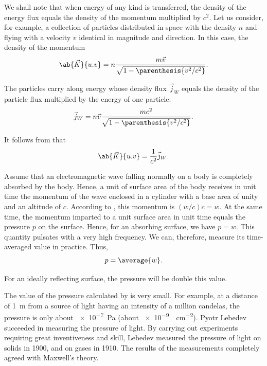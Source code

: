 We shall note that when energy of any kind is transferred, the density of the energy flux equals the density of the momentum multiplied by $c^2$.
Let us consider, for example, a collection of particles distributed in space with the density $n$ and flying with a velocity $v$ identical in magnitude and direction.
In this case, the density of the momentum
\begin{equation}\label{eq:15_38}
    \ab{\vec{K}}{u.v} = n \frac{m\vec{v}}{\sqrt{1 - \parenthesis{v^2/c^2}}}.
\end{equation}

\noindent
The particles carry along energy whose density flux $\vec{j}_W$ equals the density of the particle flux multiplied by the energy of one particle:
\begin{equation}\label{eq:15_39}
    \vec{j}_W = n \vec{v} \frac{mc^2}{\sqrt{1 - \parenthesis{v^2/c^2}}}.
\end{equation}

\noindent
It follows from  that
\begin{equation}\label{eq:15_40}
    \ab{\vec{K}}{u.v} = \frac{1}{c^2} \vec{j}_W.
\end{equation}

Assume that an electromagnetic wave falling normally on a body is completely absorbed by the body.
Hence, a unit of surface area of the body receives in unit time the momentum of the wave enclosed in a cylinder with a base area of unity and an altitude of $c$.
According to , this momentum is $(w/c)c=w$.
At the same time, the momentum imparted to a unit surface area in unit time equals the pressure $p$ on the surface.
Hence, for an absorbing surface, we have $p = w$.
This quantity pulsates with a very high frequency.
We can, therefore, measure its time-averaged value in practice. Thus,
\begin{equation}\label{eq:15_41}
    p = \average{w}.
\end{equation}

\noindent
For an ideally reflecting surface, the pressure will be double this value.

The value of the pressure calculated by  is very small.
For example, at a distance of \SI{1}{\metre} from a source of light having an intensity of a million candelas, the pressure is only about \SI{e-7}{\pascal} (about \SI{e-9}{\gf\per\centi\metre\squared}).
Pyotr Lebedev succeeded in measuring the pressure of light.
By carrying out experiments requiring great inventiveness and skill, Lebedev measured the pressure of light on solids in 1900, and on gases in 1910.
The results of the measurements completely agreed with Maxwell's theory.

